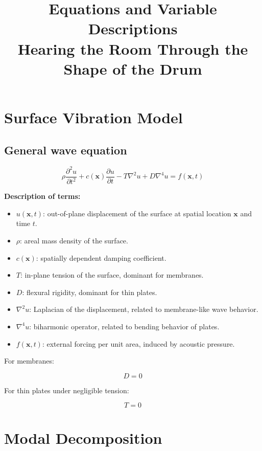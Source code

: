 \documentclass[11pt]{article}
\title{Equations and Variable Descriptions\\
\large Hearing the Room Through the Shape of the Drum}
\author{}
\date{}
\begin{document}
\maketitle

\section{Surface Vibration Model}

\subsection{General wave equation}

\begin{equation}
\rho \frac{\partial^2 u}{\partial t^2}
+
c(\bm{x}) \frac{\partial u}{\partial t}
-
T \nabla^2 u
+
D \nabla^4 u
=
f(\bm{x},t)
\end{equation}

\textbf{Description of terms:}

\begin{itemize}
    \item $u(\bm{x},t)$: out-of-plane displacement of the surface at spatial location $\bm{x}$ and time $t$.
    \item $\rho$: areal mass density of the surface.
    \item $c(\bm{x})$: spatially dependent damping coefficient.
    \item $T$: in-plane tension of the surface, dominant for membranes.
    \item $D$: flexural rigidity, dominant for thin plates.
    \item $\nabla^2 u$: Laplacian of the displacement, related to membrane-like wave behavior.
    \item $\nabla^4 u$: biharmonic operator, related to bending behavior of plates.
    \item $f(\bm{x},t)$: external forcing per unit area, induced by acoustic pressure.
\end{itemize}

For membranes:

\begin{equation}
D = 0
\end{equation}

For thin plates under negligible tension:

\begin{equation}
T = 0
\end{equation}

\section{Modal Decomposition}
\end{document}
